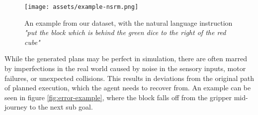\begin{figure}
    \centering    \texttt{[image: assets/example-nsrm.png]}
    \caption{An example from our dataset, with the natural language instruction \emph{"put the block which is behind the green dice to the right of the red cube"}}
    \label{fig:example-nsrm}
\end{figure}

While the generated plans may be perfect in simulation, there are often marred by imperfections in the real world caused by noise in the sensory inputs, motor failures, or unexpected collisions. This results in deviations from the original path of planned execution, which the agent needs to recover from. An example can be seen in figure \ref{fig:error-example}, where the block falls off from the gripper mid-journey to the next sub goal. 

